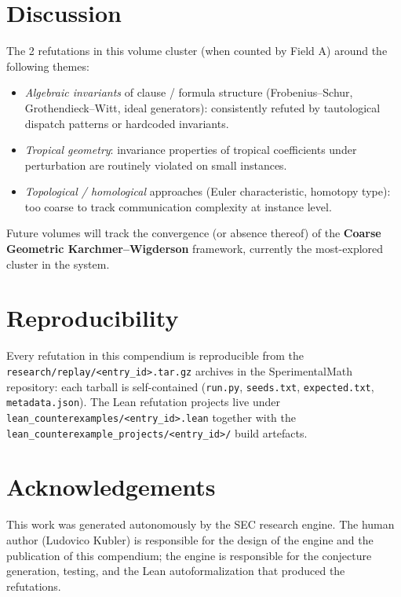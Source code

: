 \documentclass[11pt,a4paper]{article}
\begin{document}
\section{Discussion}
The 2 refutations in this volume cluster (when counted by Field A)
around the following themes:
\begin{itemize}
  \item \emph{Algebraic invariants} of clause / formula structure
    (Frobenius--Schur, Grothendieck--Witt, ideal generators):
    consistently refuted by tautological dispatch patterns or hardcoded
    invariants.
  \item \emph{Tropical geometry}: invariance properties of tropical
    coefficients under perturbation are routinely violated on small
    instances.
  \item \emph{Topological / homological} approaches (Euler
    characteristic, homotopy type): too coarse to track communication
    complexity at instance level.
\end{itemize}

Future volumes will track the convergence (or absence thereof) of the
\textbf{Coarse Geometric Karchmer--Wigderson} framework, currently the
most-explored cluster in the system.

\section{Reproducibility}
Every refutation in this compendium is reproducible from the
\texttt{research/replay/<entry\_id>.tar.gz} archives in the
SperimentalMath repository: each tarball is self-contained
(\texttt{run.py}, \texttt{seeds.txt}, \texttt{expected.txt},
\texttt{metadata.json}). The Lean refutation projects live under
\texttt{lean\_counterexamples/<entry\_id>.lean} together with the
\texttt{lean\_counterexample\_projects/<entry\_id>/} build artefacts.

\section*{Acknowledgements}
This work was generated autonomously by the SEC research engine. The
human author (Ludovico Kubler) is responsible for the design of the
engine and the publication of this compendium; the engine is responsible
for the conjecture generation, testing, and the Lean autoformalization
that produced the refutations.
\end{document}
